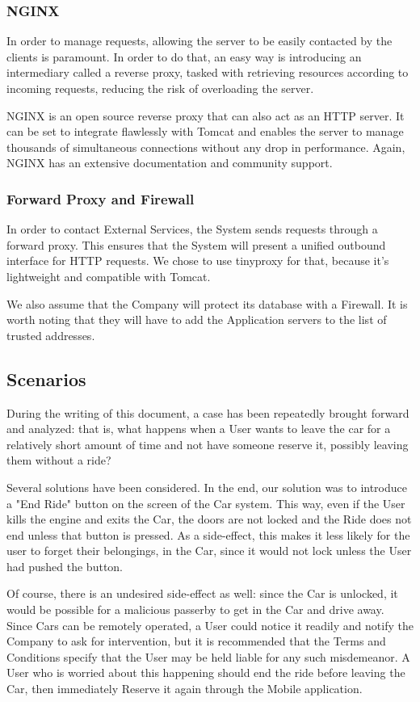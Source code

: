 \documentclass[12pt]{article}
\begin{document}
\subsubsection{NGINX}
In order to manage requests, allowing the server to be easily contacted by the clients is paramount. In order to do that, an easy way is introducing an intermediary called a reverse proxy, tasked with retrieving resources according to incoming requests, reducing the risk of overloading the server.

NGINX is an open source reverse proxy that can also act as an HTTP server. It can be set to integrate flawlessly with Tomcat and enables the server to manage thousands of simultaneous connections without any drop in performance. Again, NGINX has an extensive documentation and community support.

\subsubsection{Forward Proxy and Firewall}
In order to contact External Services, the System sends requests through a forward proxy. This ensures that the System will present a unified outbound interface for HTTP requests. We chose to use tinyproxy for that, because it's lightweight and compatible with Tomcat.

We also assume that the Company will protect its database with a Firewall. It is worth noting that they will have to add the Application servers to the list of trusted addresses.

\subsection{Scenarios}
During the writing of this document, a case has been repeatedly brought forward and analyzed: that is, what happens when a User wants to leave the car for a relatively short amount of time and not have someone reserve it, possibly leaving them without a ride?

Several solutions have been considered. In the end, our solution was to introduce a "End Ride" button on the screen of the Car system. This way, even if the User kills the engine and exits the Car, the doors are not locked and the Ride does not end unless that button is pressed. As a side-effect, this makes it less likely for the user to forget their belongings, in the Car, since it would not lock unless the User had pushed the button.

Of course, there is an undesired side-effect as well: since the Car is unlocked, it would be possible for a malicious passerby to get in the Car and drive away. Since Cars can be remotely operated, a User could notice it readily and notify the Company to ask for intervention, but it is recommended that the Terms and Conditions specify that the User may be held liable for any such misdemeanor. A User who is worried about this happening should end the ride before leaving the Car, then immediately Reserve it again through the Mobile application.
\end{document}
